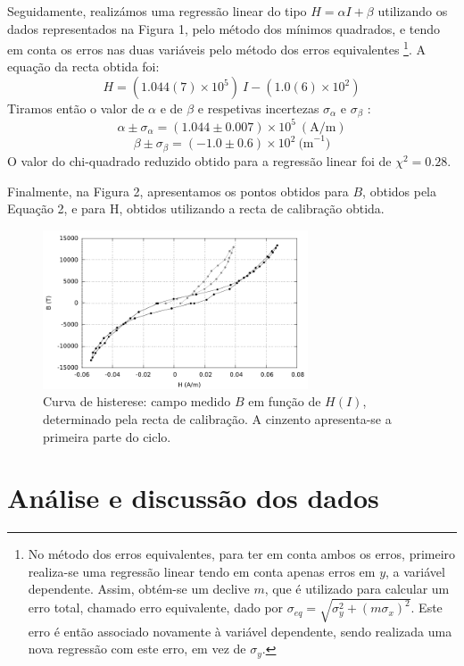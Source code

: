 \documentclass[a4paper]{article}
\begin{document}
Seguidamente, realizámos uma regressão linear do tipo $H=\alpha I + \beta $ utilizando os dados representados na Figura 1, pelo método dos mínimos quadrados, e tendo em conta os erros nas duas variáveis pelo método dos erros equivalentes \footnote{No método dos erros equivalentes, para ter em conta ambos os erros, primeiro realiza-se uma regressão linear tendo em conta apenas erros em $y$, a variável dependente. Assim, obtém-se um declive $m$, que é utilizado para calcular um erro total, chamado erro equivalente, dado por $\sigma_{eq}=\sqrt{\sigma_y^2+(m\sigma_x)^2}$. Este erro é então associado novamente à variável dependente, sendo realizada uma nova regressão com este erro, em vez de $\sigma_y$.}. A equação da recta obtida foi:
\begin{equation}
H=(1.044(7)\times 10^{5})~I-(1.0(6)\times 10^{2})
\end{equation}
Tiramos então o valor de $\alpha$ e de $\beta$ e respetivas incertezas $\sigma_{\alpha}$ e $\sigma_{\beta}$ :
$$\alpha \pm \sigma_{\alpha}=(1.044 \pm 0.007) \times 10^{5} \mathrm{~(A/m)}$$
$$\beta \pm \sigma_{\beta}=(-1.0 \pm 0.6) \times 10^{2} \mathrm{~ (m}^{-1})$$
O valor do chi-quadrado reduzido obtido para a regressão linear foi de $ \chi^2=0.28$.

Finalmente, na Figura 2, apresentamos os pontos obtidos para $B$, obtidos pela Equação 2, e para H, obtidos utilizando a recta de calibração obtida.
\begin{figure}[htbp]
\centering
\includegraphics[width=0.7\textwidth]{./Imagens/grafico2.pdf}
\caption{Curva de histerese: campo medido $B$ em função de $H(I)$, determinado pela recta de calibração. A cinzento apresenta-se a primeira parte do ciclo.}
\end{figure}

\section{Análise e discussão dos dados}
\end{document}
